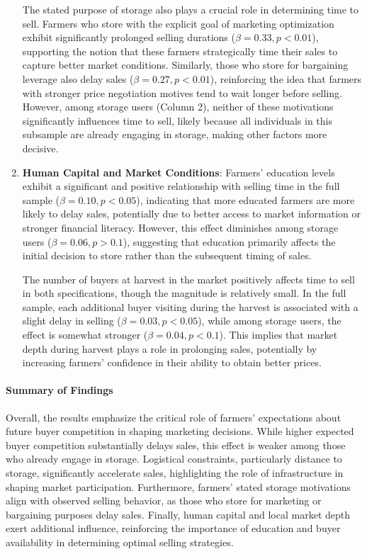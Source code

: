 \documentclass[12pt]{article}
\begin{document}
\begin{enumerate}
    The stated purpose of storage also plays a crucial role in determining time to sell. Farmers who store with the explicit goal of marketing optimization exhibit significantly prolonged selling durations (\(\beta = 0.33, p<0.01\)), supporting the notion that these farmers strategically time their sales to capture better market conditions. Similarly, those who store for bargaining leverage also delay sales (\(\beta = 0.27, p<0.01\)), reinforcing the idea that farmers with stronger price negotiation motives tend to wait longer before selling. However, among storage users (Column 2), neither of these motivations significantly influences time to sell, likely because all individuals in this subsample are already engaging in storage, making other factors more decisive.

    \item \textbf{Human Capital and Market Conditions}: Farmers’ education levels exhibit a significant and positive relationship with selling time in the full sample (\(\beta = 0.10, p<0.05\)), indicating that more educated farmers are more likely to delay sales, potentially due to better access to market information or stronger financial literacy. However, this effect diminishes among storage users (\(\beta = 0.06, p>0.1\)), suggesting that education primarily affects the initial decision to store rather than the subsequent timing of sales.  
    
    The number of buyers at harvest in the market positively affects time to sell in both specifications, though the magnitude is relatively small. In the full sample, each additional buyer visiting during the harvest is associated with a slight delay in selling (\(\beta = 0.03, p<0.05\)), while among storage users, the effect is somewhat stronger (\(\beta = 0.04, p<0.1\)). This implies that market depth during harvest plays a role in prolonging sales, potentially by increasing farmers’ confidence in their ability to obtain better prices.
\end{enumerate}


\paragraph{Summary of Findings}  
Overall, the results emphasize the critical role of farmers’ expectations about future buyer competition in shaping marketing decisions. While higher expected buyer competition substantially delays sales, this effect is weaker among those who already engage in storage. Logistical constraints, particularly distance to storage, significantly accelerate sales, highlighting the role of infrastructure in shaping market participation. Furthermore, farmers’ stated storage motivations align with observed selling behavior, as those who store for marketing or bargaining purposes delay sales. Finally, human capital and local market depth exert additional influence, reinforcing the importance of education and buyer availability in determining optimal selling strategies.


\newpage

\end{document}
